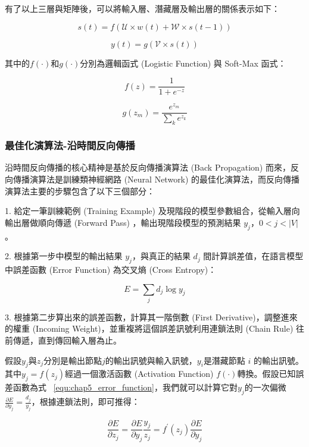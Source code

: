 有了以上三層與矩陣後，可以將輸入層、潛藏層及輸出層的關係表示如下：

\begin{equation}
s(t) = f(\mathcal{U}\times w(t) + \mathcal{W}\times s(t-1))
\end{equation}

\begin{equation}
y(t) = g(\mathcal{V}\times s(t))
\end{equation}

其中的$f(\cdot)$和$g(\cdot)$分別為邏輯函式 (Logistic Function) 與 Soft-Max 函式：

\begin{equation}
f(z) = \frac{1}{1+e^{-z}}
\end{equation}

\begin{equation}
g(z_m) = \frac{e^{z_m}}{\sum_k e^{z_k}}
\end{equation}

\subsubsection{最佳化演算法-沿時間反向傳播}
沿時間反向傳播的核心精神是基於反向傳播演算法 (Back Propagation) 而來，反向傳播演算法是訓練類神經網路 (Neural Network) 的最佳化演算法，而反向傳播演算法主要的步驟包含了以下三個部分：

1. 給定一筆訓練範例 (Training Example) 及現階段的模型參數組合，從輸入層向輸出層做順向傳遞 (Forward Pass) ，輸出現階段模型的預測結果 $y_j$，$0<j<|V|$。

2. 根據第一步中模型的輸出結果 $y_j$，與真正的結果 $d_j$ 間計算誤差值，在語言模型中誤差函數 (Error Function) 為交叉熵 (Cross Entropy)：

\begin{equation}
\label{equ:chap5_error_function}
E = \sum_j d_j \log{y_j}
\end{equation}

3. 根據第二步算出來的誤差函數，計算其一階倒數 (First Derivative)，調整進來的權重 (Incoming Weight)，並重複將這個誤差訊號利用連鎖法則 (Chain Rule) 往前傳遞，直到傳回輸入層為止。

假設$y_j$與$z_j$分別是輸出節點$j$的輸出訊號與輸入訊號，$y_i$是潛藏節點 $i$ 的輸出訊號。其中$y_j=f(z_j)$經過一個激活函數 (Activation Function) $f(\cdot)$轉換。假設已知誤差函數為式 ~\ref{equ:chap5_error_function}，我們就可以計算它對$y_j$的一次偏微$\frac{\partial E}{\partial y_j} = \frac{d_j}{y_j}$，根據連鎖法則，即可推得：

\begin{equation}
\frac{\partial E}{\partial z_j} = \frac{\partial E}{\partial y_j} \frac{y_j}{z_j} = f^{'}(z_j) \frac{\partial E}{\partial y_j}
\end{equation}

